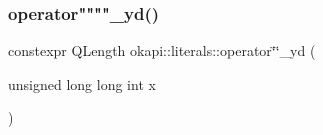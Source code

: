 \mbox{\label{namespaceokapi_1_1literals_a09b0c61689eb453818ff2126df2cde26}} 
\subsubsection{\texorpdfstring{operator""""\_yd()}{operator""\_yd()}\hspace{0.1cm}{\footnotesize\ttfamily [2/2]}}
{\footnotesize\ttfamily constexpr Q\+Length okapi\+::literals\+::operator\char`\"{}\char`\"{}\+\_\+yd (\begin{DoxyParamCaption}\item[{unsigned long long int}]{x }\end{DoxyParamCaption})}

